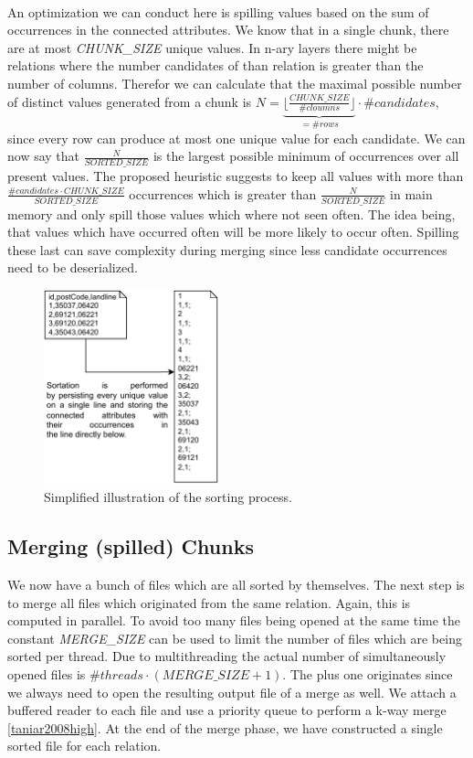 \noindent \\ An optimization we can conduct here is spilling values based on the sum of occurrences in the connected attributes. We know that in a single chunk, there are at most \textit{CHUNK\_SIZE} unique values. In n-ary layers there might be relations where the number candidates of than relation is greater than the number of columns. Therefor we can calculate that the maximal possible number of distinct values generated from a chunk is $N = \underbrace{\lfloor \frac{CHUNK\_SIZE}{\#cloumns} \rfloor}_{= \#rows} \cdot \#candidates$, since every row can produce at most one unique value for each candidate. We can now say that $\frac{N}{SORTED\_SIZE}$ is the largest possible minimum of occurrences over all present values. The proposed heuristic suggests to keep all values with more than $\frac{\#candidates \cdot CHUNK\_SIZE}{SORTED\_SIZE}$ occurrences which is greater than $\frac{N}{SORTED\_SIZE}$ in main memory and only spill those values which where not seen often. The idea being, that values which have occurred often will be more likely to occur often. Spilling these last can save complexity during merging since less candidate occurrences need to be deserialized.

\begin{figure}[h]
    \centering
    \includegraphics[width=0.45\textwidth]{figures/Sorting.pdf}
    \caption{Simplified illustration of the sorting process.}
    \label{fig:sorting}
\end{figure}

\subsection{Merging (spilled) Chunks}
We now have a bunch of files which are all sorted by themselves. The next step is to merge all files which originated from the same relation. Again, this is computed in parallel. To avoid too many files being opened at the same time the constant \textit{MERGE\_SIZE} can be used to limit the number of files which are being sorted per thread. Due to multithreading the actual number of simultaneously opened files is $\#threads \cdot (MERGE\_SIZE + 1)$. The plus one originates since we always need to open the resulting output file of a merge as well. We attach a buffered reader to each file and use a priority queue to perform a k-way merge \ref{taniar2008high}. At the end of the merge phase, we have constructed a single sorted file for each relation.

